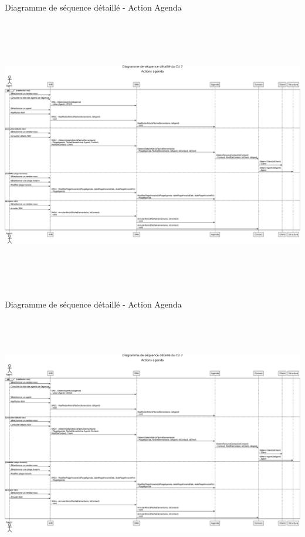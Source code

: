 \documentclass[xetex]{beamer}
\begin{document}
    \begin{frame}{Diagramme de séquence détaillé - Action Agenda}
    
  {\includegraphics[height=12cm]{../report/figures/eps/DSD_CU7_ActionsAgenda}}

    \end{frame}
    
     \begin{frame}{Diagramme de séquence détaillé - Action Agenda}
  {\includegraphics[height=12cm]{../report/figures/eps/DSD_CU7_ActionsAgenda}}
    \end{frame}
    
\end{document}
